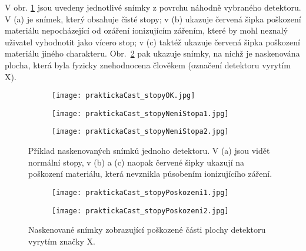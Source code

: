 V obr. \ref{fig:praktickaCast_stopy} jsou uvedeny jednotlivé snímky z povrchu náhodně vybraného detektoru. V (a) je snímek, který obsahuje čisté stopy; v (b) ukazuje červená šipka poškození materiálu nepocházející od ozáření ionizujícím zářením, které by mohl neznalý uživatel vyhodnotit jako vícero stop; v (c) taktéž ukazuje červená šipka poškození materiálu jiného charakteru. Obr.~\ref{fig:praktickaCast_stopyPoskozeni} pak ukazuje snímky, na nichž je naskenována plocha, která byla fyzicky znehodnocena člověkem (označení detektoru vyrytím X). 
\begin{figure}[h]
  \centering
  \begin{subfigure}{0.7\textwidth}
	\texttt{[image: praktickaCast\_stopyOK.jpg]}
	\caption{}
  \end{subfigure}
  \begin{subfigure}{0.7\textwidth}
	\texttt{[image: praktickaCast\_stopyNeniStopa1.jpg]}
	\caption{}
  \end{subfigure}
  \begin{subfigure}{0.7\textwidth}
	\texttt{[image: praktickaCast\_stopyNeniStopa2.jpg]}
	\caption{}
  \end{subfigure}
  \caption{Příklad naskenovaných snímků jednoho detektoru. V (a) jsou vidět normální stopy, v (b) a (c) naopak červené šipky ukazují na poškození materiálu, která nevznikla působením ionizujícího záření.}
  \label{fig:praktickaCast_stopy}
\end{figure}
\begin{figure}[h]
  \centering
  \begin{subfigure}{0.7\textwidth}
	\texttt{[image: praktickaCast\_stopyPoskozeni1.jpg]}
	\caption{}
  \end{subfigure}
  \begin{subfigure}{0.7\textwidth}
	\texttt{[image: praktickaCast\_stopyPoskozeni2.jpg]}
	\caption{}
  \end{subfigure}
  \caption{Naskenované snímky zobrazující poškozené části plochy detektoru vyrytím značky X.}
  \label{fig:praktickaCast_stopyPoskozeni}
\end{figure}

